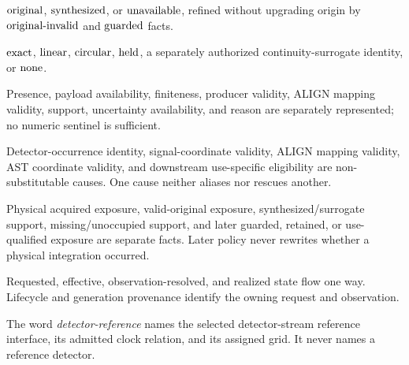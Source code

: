 \begin{description}[style=nextline,leftmargin=0pt]
\item[Origin] \(\mathrm{original}\), \(\mathrm{synthesized}\), or
\(\mathrm{unavailable}\), refined without upgrading origin by
\(\mathrm{original\mbox{-}invalid}\) and \(\mathrm{guarded}\) facts.
\item[Method] \(\mathrm{exact}\), \(\mathrm{linear}\),
\(\mathrm{circular}\), \(\mathrm{held}\), a separately authorized
continuity-surrogate identity, or \(\mathrm{none}\).
\item[Availability and validity] Presence, payload availability, finiteness,
producer validity, ALIGN mapping validity, support, uncertainty availability,
and reason are separately represented; no numeric sentinel is sufficient.
\item[Five causes] Detector-occurrence identity, signal-coordinate validity,
ALIGN mapping validity, AST coordinate validity, and downstream use-specific
eligibility are non-substitutable causes.  One cause neither aliases nor
rescues another.
\item[Exposure facts] Physical acquired exposure, valid-original exposure,
synthesized/surrogate support, missing/unoccupied support, and later guarded,
retained, or use-qualified exposure are separate facts.  Later policy never
rewrites whether a physical integration occurred.
\item[Resolution state] Requested, effective, observation-resolved, and
realized state flow one way.  Lifecycle and generation provenance identify
the owning request and observation.
\end{description}

The word \emph{detector-reference} names the selected detector-stream
reference interface, its admitted clock relation, and its assigned grid.  It
never names a reference detector.
